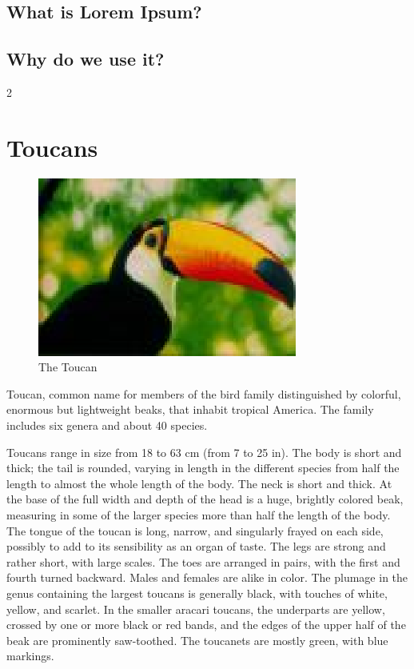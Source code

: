 \documentclass{article}
\begin{document}
    \begin{justify}
        \begin{multicols}{2}
            \section{What is Lorem Ipsum?}
            \lipsum[1][1-7]
            \subsection{Why do we use it?}
            \lipsum[2][1-4]
        \end{multicols}{2}
    \end{justify}
    \vspace*{30mm}

    \section*{Toucans}
    \begin{figure}
        \begin{center}
            \includegraphics{toucan.eps}
        \end{center}
        \caption{The Toucan}
    \end{figure}
\justifying
Toucan, common name for members of the bird family distinguished by
colorful, enormous but lightweight beaks, that inhabit tropical America.
The family includes six genera and about 40 species.


Toucans range in size from 18 to 63 cm (from 7 to 25 in). The body is
short and thick; the tail is rounded, varying in length in the different
species from half the length to almost the whole length of the body. The
neck is short and thick. At the base of the full width and depth of the
head is a huge, brightly colored beak, measuring in some of the larger
species more than half the length of the body. The tongue of the toucan
is long, narrow, and singularly frayed on each side, possibly to add to
its sensibility as an organ of taste. The legs are strong and rather
short, with large scales. The toes are arranged in pairs, with the first
and fourth turned backward. Males and females are alike in color. The
plumage in the genus containing the largest toucans is generally black,
with touches of white, yellow, and scarlet. In the smaller aracari
toucans, the underparts are yellow, crossed by one or more black or red
bands, and the edges of the upper half of the beak are prominently
saw-toothed. The toucanets are mostly green, with blue markings.
\end{document}
